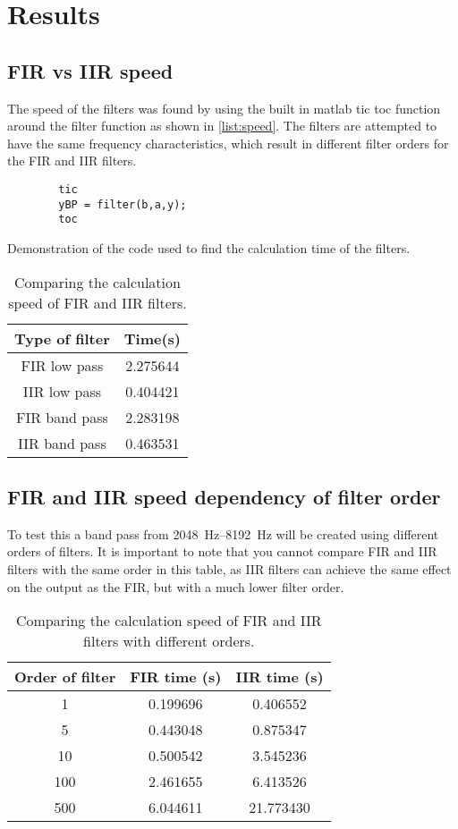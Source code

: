 
\section{Results}

\subsection{FIR vs IIR speed}
The speed of the filters was found by using the built in matlab tic toc function around the filter function as shown in \cref{list:speed}. The filters are attempted to have the same frequency characteristics, which result in different filter orders for the FIR and IIR filters.

\begin{listing}
	\begin{verbatim}
		tic
		yBP = filter(b,a,y);
		toc
	\end{verbatim}
	\caption{Demonstration of the code used to find the calculation time of the filters.}
	\label{list:speed}
\end{listing}

\begin{table}[!htb]
	\centering
	\caption{Comparing the calculation speed of FIR and IIR filters.}
	\label{tab:speed}
	\begin{tabular}{cc}
		Type of filter & Time(\si{\second}) \\
		\midrule
		FIR low pass & \num{2.275644}\\
		IIR low pass & \num{0.404421}\\
		FIR band pass & \num{2.283198}\\
		IIR band pass & \num{0.463531}
	\end{tabular}
\end{table}

\subsection{FIR and IIR speed dependency of filter order}
To test this a band pass from \SIrange{2048}{8192}{\hertz} will be created using different orders of filters. It is important to note that you cannot compare FIR and IIR filters with the same order in this table, as IIR filters can achieve the same effect on the output as the FIR, but with a much lower filter order.
\begin{table}[!htb]
	\centering
	\caption{Comparing the calculation speed of FIR and IIR filters with different orders.}
	\label{tab:FIR_speed}
	\begin{tabular}{ccc}
		Order of filter & FIR time (\si{\second}) & IIR time (\si{\second}) \\
		\midrule
		1		&	\num{0.199696} & \num{0.406552}\\
		5		& \num{0.443048} & \num{0.875347} \\
		10		& \num{0.500542}	 & \num{3.545236}\\
		100		& \num{2.461655}	 & \num{6.413526} \\
		500		& \num{6.044611}	 & \num{21.773430} \\
	\end{tabular}
\end{table}